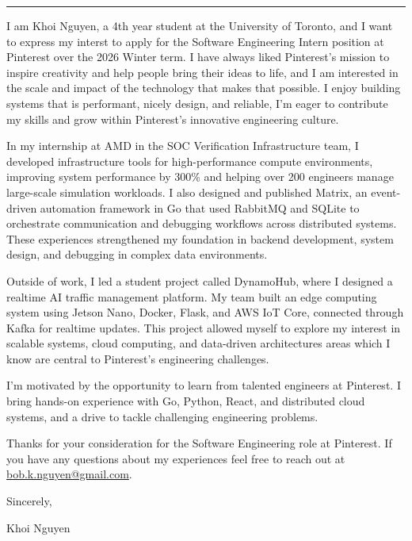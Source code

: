 \documentclass[
	12pt, %
]{resume} %
\begin{document}
    \medskip
    \hrule %
    \medskip  

I am Khoi Nguyen, a 4th year student at the University of Toronto, and I want to express my interst to apply for the Software Engineering Intern position at Pinterest over the 2026 Winter term. I have always liked Pinterest's mission to inspire creativity and help people bring their ideas to life, and I am interested in the scale and impact of the technology that makes that possible. I enjoy building systems that is performant, nicely design, and reliable, I'm eager to contribute my skills and grow within Pinterest's innovative engineering culture.

In my internship at AMD in the SOC Verification Infrastructure team, I developed infrastructure tools for high-performance compute environments, improving system performance by 300\% and helping over 200 engineers manage large-scale simulation workloads. I also designed and published Matrix, an event-driven automation framework in Go that used RabbitMQ and SQLite to orchestrate communication and debugging workflows across distributed systems. These experiences strengthened my foundation in backend development, system design, and debugging in complex data environments.

Outside of work, I led a student project called DynamoHub, where I designed a realtime AI traffic management platform. My team built an edge computing system using Jetson Nano, Docker, Flask, and AWS IoT Core, connected through Kafka for realtime updates. This project allowed myself to explore my interest in scalable systems, cloud computing, and data-driven architectures areas which I know are central to Pinterest's engineering challenges.

I'm motivated by the opportunity to learn from talented engineers at Pinterest. I bring hands-on experience with Go, Python, React, and distributed cloud systems, and a drive to tackle challenging engineering problems.

Thanks for your consideration for the Software Engineering role at Pinterest. If you have any questions about my experiences feel free to reach out at \href{mailto:bob.k.nguyen@gmail.com}{bob.k.nguyen@gmail.com}.

Sincerely,

Khoi Nguyen
\end{document}
